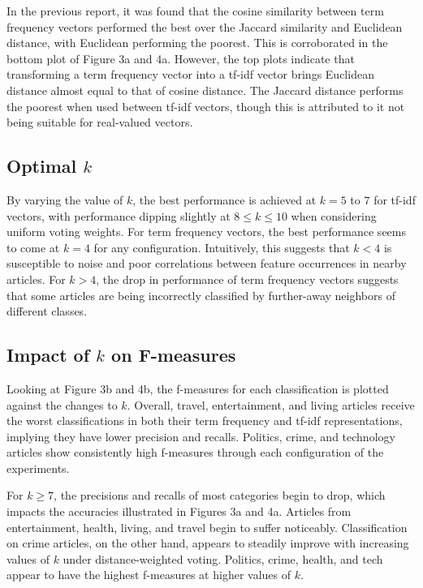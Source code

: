 \documentclass[11pt]{article}
\begin{document}
In the previous report, it was found that the cosine similarity between term frequency vectors performed the best over the Jaccard similarity and Euclidean distance, with Euclidean performing the poorest.
This is corroborated in the bottom plot of Figure 3a and 4a.
However, the top plots indicate that transforming a term frequency vector into a tf-idf vector brings Euclidean distance almost equal to that of cosine distance.
The Jaccard distance performs the poorest when used between tf-idf vectors, though this is attributed to it not being suitable for real-valued vectors.

\subsection{Optimal $k$}

By varying the value of $k$, the best performance is achieved at $k=5$ to $7$ for tf-idf vectors, with performance dipping slightly at $8 \le k \le 10$ when considering uniform voting weights.
For term frequency vectors, the best performance seems to come at $k=4$ for any configuration.
Intuitively, this suggests that $k<4$ is susceptible to noise and poor correlations between feature occurrences in nearby articles.
For $k>4$, the drop in performance of term frequency vectors suggests that some articles are being incorrectly classified by further-away neighbors of different classes.

\subsection{Impact of $k$ on F-measures}

Looking at Figure 3b and 4b, the f-measures for each classification is plotted against the changes to $k$.
Overall, travel, entertainment, and living articles receive the worst classifications in both their term frequency and tf-idf representations, implying they have lower precision and recalls.
Politics, crime, and technology articles show consistently high f-measures through each configuration of the experiments.

For $k\ge7$, the precisions and recalls of most categories begin to drop, which impacts the accuracies illustrated in Figures 3a and 4a.
Articles from entertainment, health, living, and travel begin to suffer noticeably.
Classification on crime articles, on the other hand, appears to steadily improve with increasing values of $k$ under distance-weighted voting.
Politics, crime, health, and tech appear to have the highest f-measures at higher values of $k$.
\end{document}
